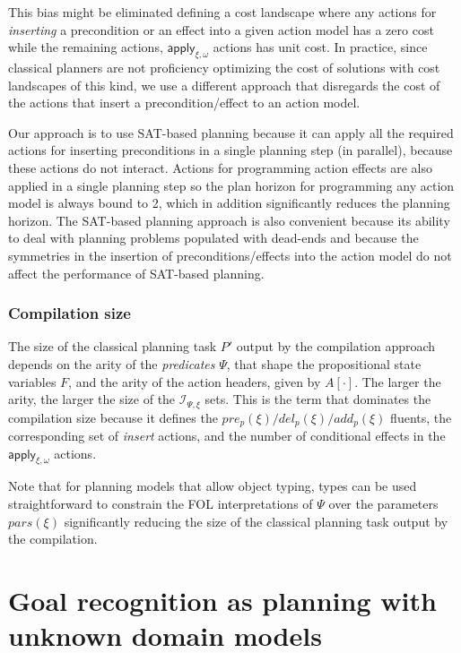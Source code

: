 \documentclass{article}
\begin{document}
This bias might be eliminated defining a cost landscape where any actions for {\em inserting} a precondition or an effect into a given action model has a zero cost while the remaining actions, $\mathsf{apply_{\xi,\omega}}$ actions has unit cost. In practice, since classical planners are not proficiency optimizing the cost of solutions with cost landscapes of this kind, we use a different approach that disregards the cost of the actions that insert a precondition/effect to an action model.

Our approach is to use SAT-based planning because it can apply all the required actions for inserting preconditions in a single planning step (in parallel), because these actions do not interact. Actions for programming action effects are also applied in a single planning step so the plan horizon for programming any action model is always bound to 2, which in addition significantly reduces the planning horizon. The SAT-based planning approach is also convenient because its ability to deal with planning problems populated with dead-ends and because the symmetries in the insertion of preconditions/effects into the action model do not affect the performance of SAT-based planning.

\subsubsection{Compilation size}
The size of the classical planning task $P'$ output by the compilation approach depends on the arity of the {\em predicates} $\Psi$, that shape the propositional state variables $F$, and the arity of the action headers, given by $A[\cdot]$. The larger the arity, the larger the size of the ${\mathcal I}_{\Psi,\xi}$ sets. This is the term that dominates the compilation size because it defines the $pre_p(\xi)/del_p(\xi)/add_p(\xi)$ fluents, the corresponding set of {\em insert} actions, and the number of conditional effects in the $\mathsf{apply_{\xi,\omega}}$ actions.

Note that for planning models that allow object typing, types can be used straightforward to constrain the FOL interpretations of $\Psi$ over the parameters $pars(\xi)$ significantly reducing the size of the classical planning task output by the compilation.



\section{Goal recognition as planning with unknown domain models}
\label{sec:recognition}
\end{document}

